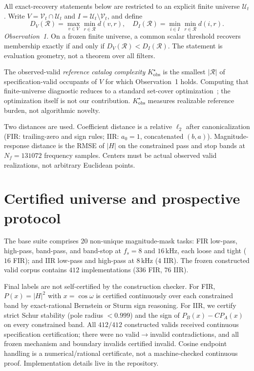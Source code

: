 \documentclass{article}
\begin{document}
All exact-recovery statements below are restricted to an explicit
finite universe $\mathcal{U}_t$.
Write $V=\mathcal{V}_t\cap\mathcal{U}_t$ and
$I=\mathcal{U}_t\setminus\mathcal{V}_t$, and define
\begin{equation}
D_V(\mathcal{R})=\max_{v\in V}\min_{r\in\mathcal{R}}d(v,r),
\quad
D_I(\mathcal{R})=\min_{i\in I}\min_{r\in\mathcal{R}}d(i,r).
\label{eq:DVDI}
\end{equation}
\emph{Observation~1.}
On a frozen finite universe, a common scalar threshold recovers
membership exactly if and only if
$D_V(\mathcal{R})<D_I(\mathcal{R})$.
The statement is evaluation geometry, not a theorem over all
filters.

The observed-valid \emph{reference catalog complexity}
$K^\star_{\mathrm{obs}}$ is the smallest
$\lvert\mathcal{R}\rvert$ of specification-valid occupants of
$V$ for which Observation~1 holds.
Computing that finite-universe diagnostic reduces to a standard
set-cover
optimization~\cite{chvatal1979setcover,hart1968cnn}; the
optimization itself is not our contribution.
$K^\star_{\mathrm{obs}}$ measures realizable reference burden, not
algorithmic novelty.

Two distances are used.
Coefficient distance is a relative $\ell_2$ after
canonicalization (FIR: trailing-zero and sign rules; IIR:
$a_0=1$, concatenated $(b,a)$).
Magnitude-response distance is the RMSE of $\lvert H\rvert$ on the
constrained pass and stop bands at $N_f=131072$ frequency
samples.
Centers must be actual observed valid realizations, not arbitrary
Euclidean points.

\section{Certified universe and prospective protocol}
\label{sec:protocol}

The base suite comprises 20 non-unique magnitude-mask tasks:
FIR low-pass, high-pass, band-pass, and band-stop at
$f_s=8$ and $16\,\mathrm{kHz}$, each loose and tight ($16$ FIR);
and IIR low-pass and high-pass at $8\,\mathrm{kHz}$ ($4$ IIR).
The frozen constructed valid corpus contains $412$
implementations ($336$ FIR, $76$ IIR).

Final labels are not self-certified by the construction checker.
For FIR, $P(x)=\lvert H\rvert^2$ with $x=\cos\omega$ is certified
continuously over each constrained band by exact-rational
Bernstein or Sturm sign reasoning.
For IIR, we certify strict Schur stability (pole radius
$<0.999$) and the sign of $P_B(x)-C P_A(x)$ on every constrained
band.
All $412/412$ constructed valids received continuous
specification certification; there were no valid$\to$invalid
contradictions, and all frozen mechanism and boundary invalids
certified invalid.
Cosine endpoint handling is a numerical/rational certificate, not
a machine-checked continuous proof.
Implementation details live in the repository.
\end{document}
